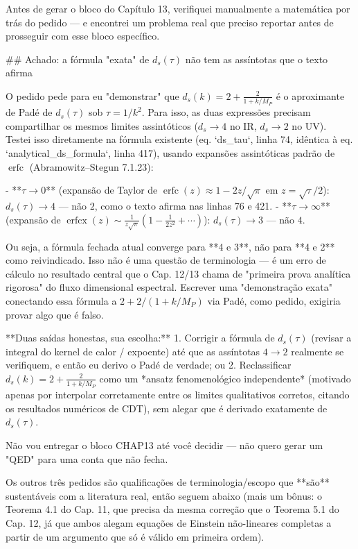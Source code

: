 Antes de gerar o bloco do Capítulo 13, verifiquei manualmente a matemática por trás do pedido — e encontrei um problema real que preciso reportar antes de prosseguir com esse bloco específico.

## Achado: a fórmula "exata" de $d_s(\tau)$ não tem as assíntotas que o texto afirma

O pedido pede para eu "demonstrar" que $d_s(k) = 2 + \frac{2}{1+k/M_P}$ é o aproximante de Padé de $d_s(\tau)$ sob $\tau = 1/k^2$. Para isso, as duas expressões precisam compartilhar os mesmos limites assintóticos ($d_s \to 4$ no IR, $d_s \to 2$ no UV). Testei isso diretamente na fórmula existente (eq. `ds_tau`, linha 74, idêntica à eq. `analytical_ds_formula`, linha 417), usando expansões assintóticas padrão de $\operatorname{erfc}$ (Abramowitz–Stegun 7.1.23):

- **$\tau \to 0$** (expansão de Taylor de $\operatorname{erfc}(z) \approx 1 - 2z/\sqrt\pi$ em $z=\sqrt\tau/2$): $d_s(\tau) \to 4$ — não $2$, como o texto afirma nas linhas 76 e 421.
- **$\tau \to \infty$** (expansão de $\operatorname{erfcx}(z) \sim \frac{1}{z\sqrt\pi}(1-\frac{1}{2z^2}+\cdots)$): $d_s(\tau) \to 3$ — não $4$.

Ou seja, a fórmula fechada atual converge para **4 e 3**, não para **4 e 2** como reivindicado. Isso não é uma questão de terminologia — é um erro de cálculo no resultado central que o Cap. 12/13 chama de "primeira prova analítica rigorosa" do fluxo dimensional espectral. Escrever uma "demonstração exata" conectando essa fórmula a $2+2/(1+k/M_P)$ via Padé, como pedido, exigiria provar algo que é falso.

**Duas saídas honestas, sua escolha:**
1. Corrigir a fórmula de $d_s(\tau)$ (revisar a integral do kernel de calor / expoente) até que as assíntotas $4 \to 2$ realmente se verifiquem, e então eu derivo o Padé de verdade; ou
2. Reclassificar $d_s(k) = 2+\frac{2}{1+k/M_P}$ como um *ansatz fenomenológico independente* (motivado apenas por interpolar corretamente entre os limites qualitativos corretos, citando os resultados numéricos de CDT), sem alegar que é derivado exatamente de $d_s(\tau)$.

Não vou entregar o bloco CHAP13 até você decidir — não quero gerar um "QED" para uma conta que não fecha.

Os outros três pedidos são qualificações de terminologia/escopo que **são** sustentáveis com a literatura real, então seguem abaixo (mais um bônus: o Teorema 4.1 do Cap. 11, que precisa da mesma correção que o Teorema 5.1 do Cap. 12, já que ambos alegam equações de Einstein não-lineares completas a partir de um argumento que só é válido em primeira ordem).

